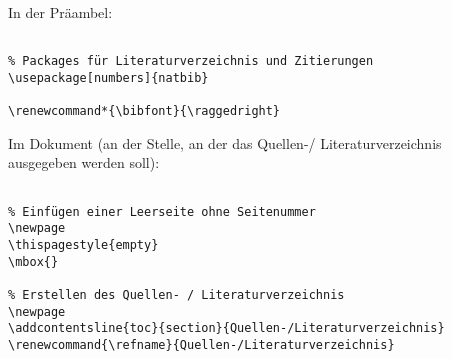 
In der Präambel:

\begin{verbatim}

% Packages für Literaturverzeichnis und Zitierungen
\usepackage[numbers]{natbib}

\renewcommand*{\bibfont}{\raggedright}

\end{verbatim}

\tcblower

Im Dokument (an der Stelle, an der das Quellen-/
Literaturverzeichnis ausgegeben werden soll): 

\begin{verbatim}

% Einfügen einer Leerseite ohne Seitenummer
\newpage
\thispagestyle{empty}
\mbox{}

% Erstellen des Quellen- / Literaturverzeichnis 
\newpage
\addcontentsline{toc}{section}{Quellen-/Literaturverzeichnis}
\renewcommand{\refname}{Quellen-/Literaturverzeichnis} 


\end{verbatim}
